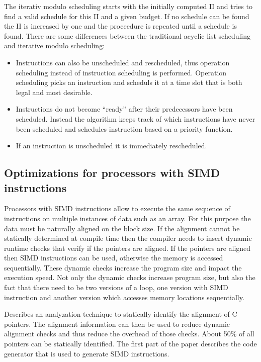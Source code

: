 \documentclass[a4paper,10pt]{article}
\begin{document}
The iterativ modulo scheduling starts with the initially computed II and tries to find a valid schedule for this II and a given budget. If
no schedule can be found the II is increased by one and the proceedure is repeated until a schedule is found. There are some differences
between the traditional acyclic list scheduling and iterative modulo scheduling:
\begin{itemize}
 \item Instructions can also be unscheduled and rescheduled, thus operation scheduling instead of instruction scheduling is performed. 
       Operation scheduling picks an instruction and scheduls it at a time slot that is both legal and most desirable.
 \item Instructions do not become ``ready'' after their predecessors have been scheduled. Instead the algorithm keeps track of which 
       instructions have never been scheduled and schedules instruction based on a priority function.
 \item If an instruction is unscheduled it is immediately rescheduled.
\end{itemize}

\subsection{Optimizations for processors with SIMD instructions}
Processors with SIMD instructions allow to execute the same sequence of instructions on multiple instances of data such as an array. For
this purpose the data must be naturally aligned on the block size. If the alignment cannot be statically determined at compile time
then the compiler needs to insert dynamic runtime checks that verify if the pointers are aligned. If the pointers are aligned then
SIMD instructions can be used, otherwise the memory is accessed sequentially. These dynamic checks increase the program size and impact 
the execution speed. Not only the dynamic checks increase program size, but also the fact that there need to be two versions of a loop,
one version with SIMD instruction and another version which accesses memory locations sequentially.

Describes an analyzation technique to statically identify the alignment of C pointers. The alignment information can then be used to 
reduce dynamic alignment checks and thus reduce the overhead of those checks. About 50\% of all pointers can be statically
identified. The first part of the paper describes the code generator that is used to generate SIMD instructions.
\end{document}
